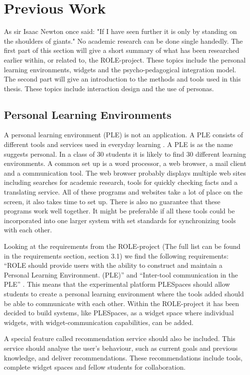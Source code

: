 \section {Previous Work}
As sir Isaac Newton once said: "If I have seen further it is only by standing on the shoulders of giants." No academic research can be done single handedly. The first part of this section will give a short summary of what has been researched earlier within, or related to, the ROLE-project. These topics include the personal learning environments, widgets and the psycho-pedagogical integration model. The second part will give an introduction to the methods and tools used in this thesis. These topics include interaction design and the use of personas.

\subsection { Personal Learning Environments }
A personal learning environment (PLE) is not an application. A PLE consists of different tools and services used in everyday learning \cite{attwell}. A PLE is as the name suggests personal. In a class of 30 students it is likely to find 30 different learning environments. A common set up is a word processor, a web browser, a mail client and a communication tool. The web browser probably displays multiple web sites including searches for academic research, tools for quickly checking facts and a translating service. All of these programs and websites take a lot of place on the screen, it also takes time to set up. There is also no guarantee that these programs work well together.  It might be preferable if all these tools could be incorporated into one larger system with set standards for synchronizing tools with each other.

Looking at the requirements from the ROLE-project (The full list can be found in the requirements section, section 3.1) we find the following requirements: “ROLE should provide users with the ability to construct and maintain a Personal Learning Environment. (PLE)” and “Inter-tool communication in the PLE” \cite{chatterjee}. This means that the experimental platform PLESpaces should allow students to create a personal learning environment where the tools added should be able to communicate with each other. Within the ROLE-project it has been decided to build systems, like PLESpaces, as a widget space where individual widgets, with widget-communication capabilities, can be added.

A special feature called recommendation service should also be included. This service should analyse the user's behaviour, such as current goals and previous knowledge, and deliver recommendations. These recommendations include tools, complete widget spaces and fellow students for collaboration.


